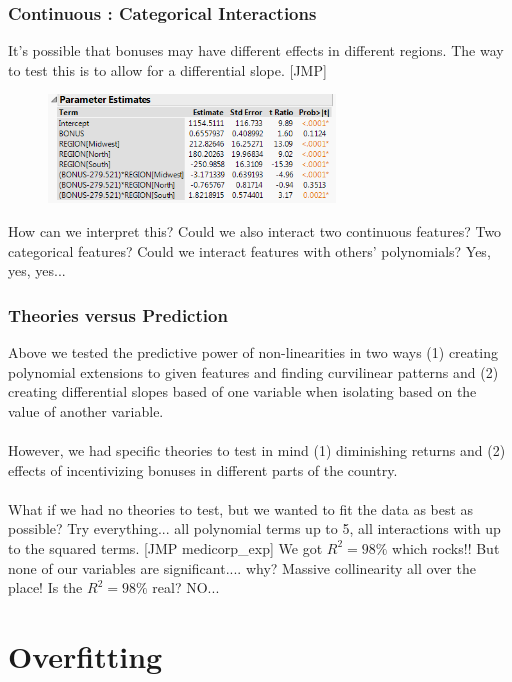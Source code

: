 \documentclass[handout]{beamer}
\begin{document}
\begin{frame}\frametitle{Continuous : Categorical Interactions}

It's possible that bonuses may have different effects in different regions. The way to test this is to allow for a differential slope. [JMP] \pause


\begin{figure}
\centering\includegraphics[width=3in]{interactions.png}
\end{figure}

How can we interpret this? \pause Could we also interact two continuous features? Two categorical features? Could we interact features with others' polynomials? Yes, yes, yes...
	
\end{frame}

\begin{frame}\frametitle{Theories versus Prediction}

Above we tested the predictive power of non-linearities in two ways \pause (1) creating polynomial extensions to given features and finding curvilinear patterns and \pause (2) creating differential slopes based of one variable when isolating based on the value of another variable. \\~\\

However, we had specific theories to test in mind \pause (1) diminishing returns and (2) effects of incentivizing bonuses in different parts of the country. \\~\\

What if we had no theories to test, but we wanted to fit the data as best as possible? \pause Try everything... all polynomial terms up to 5, all interactions with up to the squared terms. [JMP medicorp\_exp] \pause We got $R^2 = 98\%$ which rocks!! But none of our variables are significant.... why? \pause Massive collinearity all over the place! \pause Is the $R^2 = 98\%$ real? \pause NO...
	
\end{frame}

\section{Overfitting}
\end{document}
